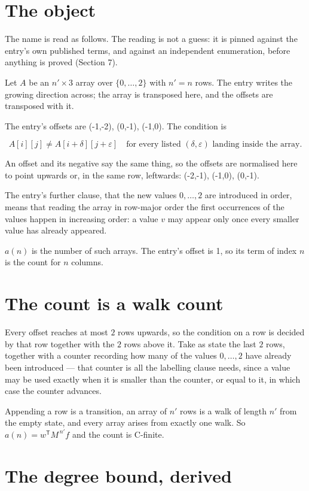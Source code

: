 \documentclass[11pt]{article}
\theoremstyle{definition}
\begin{document}
\section{The object}

The name is read as follows. The reading is not a guess: it is pinned against the entry's own published terms, and against an independent enumeration, before anything is proved (Section 7).

Let $A$ be an $n' \times 3$ array over $\{0,\dots,2\}$ with $n' = n$ rows. The entry writes the growing direction across; the array is transposed here, and the offsets are transposed with it.

The entry's offsets are (-1,-2), (0,-1), (-1,0). The condition is

\[A[i][j] \ne A[i{+}\delta][j{+}\varepsilon]\quad\text{for every listed }(\delta,\varepsilon)\text{ landing inside the array.}\]

An offset and its negative say the same thing, so the offsets are normalised here to point upwards or, in the same row, leftwards: (-2,-1), (-1,0), (0,-1).

The entry's further clause, that the new values $0,\dots,2$ are introduced in order, means that reading the array in row-major order the first occurrences of the values happen in increasing order: a value $v$ may appear only once every smaller value has already appeared.

$a(n)$ is the number of such arrays. The entry's offset is 1, so its term of index $n$ is the count for $n$ columns.

\section{The count is a walk count}

Every offset reaches at most $2$ rows upwards, so the condition on a row is decided by that row together with the $2$ rows above it. Take as state the last $2$ rows, together with a counter recording how many of the values $0,\dots,2$ have already been introduced --- that counter is all the labelling clause needs, since a value may be used exactly when it is smaller than the counter, or equal to it, in which case the counter advances.

Appending a row is a transition, an array of $n'$ rows is a walk of length $n'$ from the empty state, and every array arises from exactly one walk. So $a(n) = w^{\mathsf T}M^{\,n'}f$ and the count is C-finite.

\section{The degree bound, derived}
\end{document}
